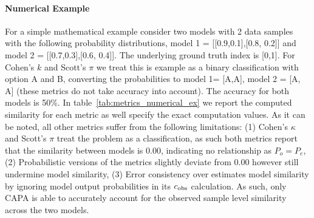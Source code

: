 \paragraph{Numerical Example} For a simple mathematical example consider two models with 2 data samples with the following probability distributions, model 1 = [[0.9,0.1],[0.8, 0.2]] and model 2 = [[0.7,0.3],[0.6, 0.4]]. The underlying ground truth index is [0,1]. For Cohen's $k$ and Scott's $\pi$ we treat this is example as a binary classification with option A and B, converting the probabilities to model 1= [A,A], model 2 = [A, A] (these metrics do not take accuracy into account). The accuracy for both models is 50\%. In table~\ref{tab:metrics_numerical_ex} we report the computed similarity for each metric as well specify the exact computation values. As it can be noted, all other metrics suffer from the following limitations: (1) Cohen's $\kappa$ and Scott's $\pi$ treat the problem as a classification, as such both metrics report that the similarity between models is 0.00, indicating no relationship as $P_o = P_e$, (2) Probabilistic versions of the metrics slightly deviate from 0.00 however still undermine model similarity, (3) Error consistency over estimates model similarity by ignoring model output probabilities in its $c_{\text{obs}}$ calculation. As such, only CAPA is able to accurately account for the observed sample level similarity across the two models. 

